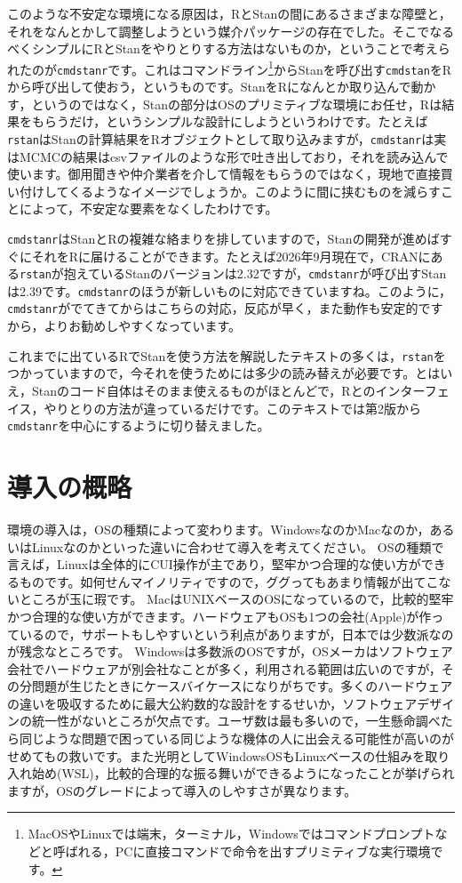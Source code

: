 \documentclass{ltjsbook}
\begin{document}
このような不安定な環境になる原因は，RとStanの間にあるさまざまな障壁と，それをなんとかして調整しようという媒介パッケージの存在でした。そこでなるべくシンプルにRとStanをやりとりする方法はないものか，ということで考えられたのが\verb|cmdstanr|です。これはコマンドライン\footnote{MacOSやLinuxでは端末，ターミナル，Windowsではコマンドプロンプトなどと呼ばれる，PCに直接コマンドで命令を出すプリミティブな実行環境です。}からStanを呼び出す\verb|cmdstan|をRから呼び出して使おう，というものです。StanをRになんとか取り込んで動かす，というのではなく，Stanの部分はOSのプリミティブな環境にお任せ，Rは結果をもらうだけ，というシンプルな設計にしようというわけです。たとえば\verb|rstan|はStanの計算結果をRオブジェクトとして取り込みますが，\verb|cmdstanr|は実はMCMCの結果はcsvファイルのような形で吐き出しており，それを読み込んで使います。御用聞きや仲介業者を介して情報をもらうのではなく，現地で直接買い付けしてくるようなイメージでしょうか。このように間に挟むものを減らすことによって，不安定な要素をなくしたわけです。

\verb|cmdstanr|はStanとRの複雑な絡まりを排していますので，Stanの開発が進めばすぐにそれをRに届けることができます。たとえば2026年9月現在で，CRANにある\verb|rstan|が抱えているStanのバージョンは2.32ですが，\verb|cmdstanr|が呼び出すStanは2.39です。\verb|cmdstanr|のほうが新しいものに対応できていますね。このように，\verb|cmdstanr|がでてきてからはこちらの対応，反応が早く，また動作も安定的ですから，よりお勧めしやすくなっています。

これまでに出ているRでStanを使う方法を解説したテキストの多くは，\verb|rstan|をつかっていますので，今それを使うためには多少の読み替えが必要です。とはいえ，Stanのコード自体はそのまま使えるものがほとんどで，Rとのインターフェイス，やりとりの方法が違っているだけです。このテキストでは第2版から\verb|cmdstanr|を中心にするように切り替えました。

\section{導入の概略}
環境の導入は，OSの種類によって変わります。WindowsなのかMacなのか，あるいはLinuxなのかといった違いに合わせて導入を考えてください。
OSの種類で言えば，Linuxは全体的にCUI操作が主であり，堅牢かつ合理的な使い方ができるものです。如何せんマイノリティですので，ググってもあまり情報が出てこないところが玉に瑕です。
MacはUNIXベースのOSになっているので，比較的堅牢かつ合理的な使い方ができます。ハードウェアもOSも1つの会社(Apple)が作っているので，サポートもしやすいという利点がありますが，日本では少数派なのが残念なところです。
Windowsは多数派のOSですが，OSメーカはソフトウェア会社でハードウェアが別会社なことが多く，利用される範囲は広いのですが，その分問題が生じたときにケースバイケースになりがちです。多くのハードウェアの違いを吸収するために最大公約数的な設計をするせいか，ソフトウェアデザインの統一性がないところが欠点です。ユーザ数は最も多いので，一生懸命調べたら同じような問題で困っている同じような機体の人に出会える可能性が高いのがせめてもの救いです。また光明としてWindowsOSもLinuxベースの仕組みを取り入れ始め(WSL)，比較的合理的な振る舞いができるようになったことが挙げられますが，OSのグレードによって導入のしやすさが異なります。
\end{document}

